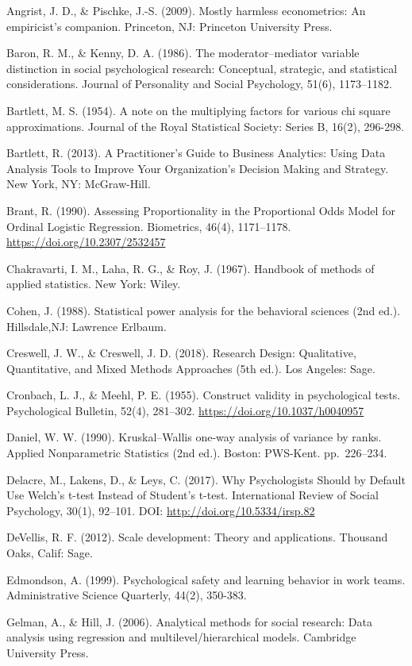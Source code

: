 \documentclass[
]{book}
\begin{document}
Angrist, J. D., \& Pischke, J.-S. (2009). Mostly harmless econometrics: An empiricist's companion. Princeton, NJ: Princeton University Press.

Baron, R. M., \& Kenny, D. A. (1986). The moderator--mediator variable distinction in social psychological research: Conceptual, strategic, and statistical considerations. Journal of Personality and Social Psychology, 51(6), 1173--1182.

Bartlett, M. S. (1954). A note on the multiplying factors for various chi square approximations. Journal of the Royal Statistical Society: Series B, 16(2), 296-298.

Bartlett, R. (2013). A Practitioner's Guide to Business Analytics: Using Data Analysis Tools to Improve Your Organization's Decision Making and Strategy. New York, NY: McGraw-Hill.

Brant, R. (1990). Assessing Proportionality in the Proportional Odds Model for Ordinal Logistic Regression. Biometrics, 46(4), 1171--1178. \url{https://doi.org/10.2307/2532457}

Chakravarti, I. M., Laha, R. G., \& Roy, J. (1967). Handbook of methods of applied statistics. New York: Wiley.

Cohen, J. (1988). Statistical power analysis for the behavioral sciences (2nd ed.). Hillsdale,NJ: Lawrence Erlbaum.

Creswell, J. W., \& Creswell, J. D. (2018). Research Design: Qualitative, Quantitative, and Mixed Methods Approaches (5th ed.). Los Angeles: Sage.

Cronbach, L. J., \& Meehl, P. E. (1955). Construct validity in psychological tests. Psychological Bulletin, 52(4), 281--302. \url{https://doi.org/10.1037/h0040957}

Daniel, W. W. (1990). Kruskal--Wallis one-way analysis of variance by ranks. Applied Nonparametric Statistics (2nd ed.). Boston: PWS-Kent. pp.~226--234.

Delacre, M., Lakens, D., \& Leys, C. (2017). Why Psychologists Should by Default Use Welch's t-test Instead of Student's t-test. International Review of Social Psychology, 30(1), 92--101. DOI: \url{http://doi.org/10.5334/irsp.82}

DeVellis, R. F. (2012). Scale development: Theory and applications. Thousand Oaks, Calif: Sage.

Edmondson, A. (1999). Psychological safety and learning behavior in work teams. Administrative Science Quarterly, 44(2), 350-383.

Gelman, A., \& Hill, J. (2006). Analytical methods for social research: Data analysis using regression and multilevel/hierarchical models. Cambridge University Press.
\end{document}
